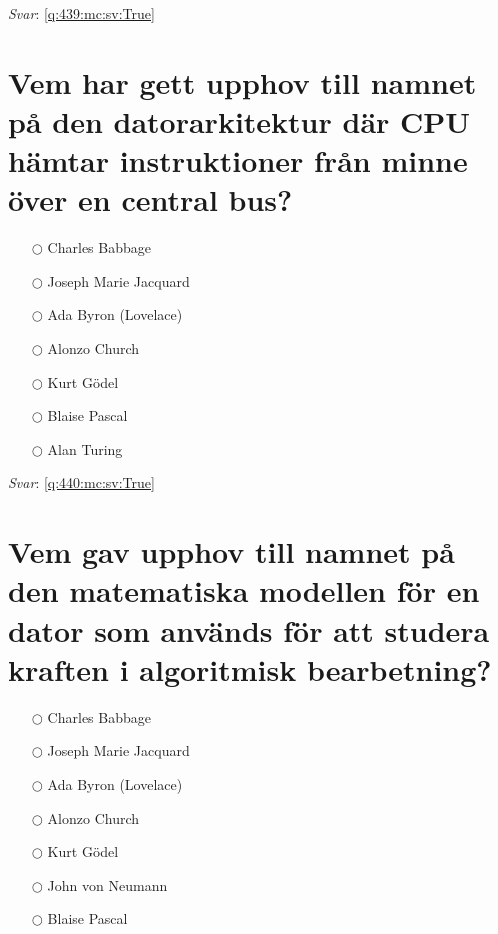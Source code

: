 \documentclass[a4paper,11pt,oneside]{book}
\begin{document}
\begin{sloppypar}
\textit{Svar}: \autoref{q:439:mc:sv:True}



\section{Vem har gett upphov till namnet p\r{a} den datorarkitektur d\"ar CPU h\"amtar instruktioner fr\r{a}n minne \"over en central bus?}

\label{q:440:mc:sv:False}

\begin{itemize}
  \item[$\bigcirc$] Charles Babbage
  \item[$\bigcirc$] Joseph Marie Jacquard
  \item[$\bigcirc$] Ada Byron (Lovelace)
  \item[$\bigcirc$] Alonzo Church
  \item[$\bigcirc$] Kurt G\"odel
  \item[$\bigcirc$] Blaise Pascal
  \item[$\bigcirc$] Alan Turing
\end{itemize}

\vspace{1cm}

\textit{Svar}: \autoref{q:440:mc:sv:True}



\section{Vem gav upphov till namnet p\r{a} den matematiska modellen f\"or en dator som anv\"ands f\"or att studera kraften i algoritmisk bearbetning?}

\label{q:441:mc:sv:False}

\begin{itemize}
  \item[$\bigcirc$] Charles Babbage
  \item[$\bigcirc$] Joseph Marie Jacquard
  \item[$\bigcirc$] Ada Byron (Lovelace)
  \item[$\bigcirc$] Alonzo Church
  \item[$\bigcirc$] Kurt G\"odel
  \item[$\bigcirc$] John von Neumann
  \item[$\bigcirc$] Blaise Pascal
\end{itemize}

\vspace{1cm}


\end{sloppypar}
\end{document}
